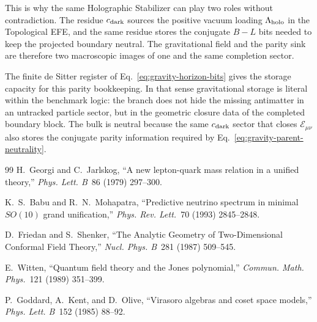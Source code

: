 \documentclass[11pt]{article}
\def\gravityenddocument{\end{document}}
\begin{document}
This is why the same Holographic Stabilizer can play two roles without
contradiction. The residue $c_{\rm dark}$ sources the positive vacuum loading
$\Lambda_{\rm holo}$ in the Topological EFE, and the same residue stores the
conjugate $B-L$ bits needed to keep the projected boundary neutral. The
gravitational field and the parity sink are therefore two macroscopic images of
one and the same completion sector.

The finite de Sitter register of Eq.~\eqref{eq:gravity-horizon-bits} gives the
storage capacity for this parity bookkeeping. In that sense gravitational
storage is literal within the benchmark logic: the branch does not hide the
missing antimatter in an untracked particle sector, but in the geometric
closure data of the completed boundary block. The bulk is neutral because the
same $c_{\rm dark}$ sector that closes $\mathcal E_{\mu\nu}$ also stores the
conjugate parity information required by Eq.~\eqref{eq:gravity-parent-neutrality}.

\ifgravitystandalone
\begin{thebibliography}{99}
H.~Georgi and C.~Jarlskog,
``A new lepton-quark mass relation in a unified theory,''
\emph{Phys. Lett. B}~86 (1979) 297--300.

K.~S.~Babu and R.~N.~Mohapatra,
``Predictive neutrino spectrum in minimal $SO(10)$ grand unification,''
\emph{Phys. Rev. Lett.}~70 (1993) 2845--2848.

D.~Friedan and S.~Shenker,
``The Analytic Geometry of Two-Dimensional Conformal Field Theory,''
\emph{Nucl. Phys. B}~281 (1987) 509--545.

E.~Witten,
``Quantum field theory and the Jones polynomial,''
\emph{Commun. Math. Phys.}~121 (1989) 351--399.

P.~Goddard, A.~Kent, and D.~Olive,
``Virasoro algebras and coset space models,''
\emph{Phys. Lett. B}~152 (1985) 88--92.
\end{thebibliography}
\fi

\gravityenddocument
\end{document}
